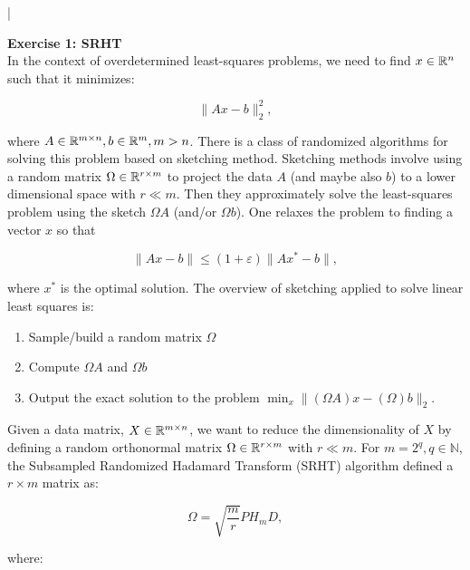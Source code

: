 \documentclass[11pt]{article}
\begin{document}
\lstset{frameround=fttt,language=Matlab}

\lstMakeShortInline[columns=fixed]|



{\bf{Exercise 1: SRHT}} \\

In the context of overdetermined least-squares problems, we need to find $x \in \mathbb{R}^n$ such that it minimizes:

\[ \|Ax - b\|_2^2, \]

where $A \in \mathbb{R}^{m \times n}, b \in \mathbb{R}^{m}, m > n$. There is a class of randomized algorithms for solving this problem based on sketching method. Sketching methods involve using a random matrix $\Omega \in \mathbb{R}^{r \times m}$ to project the data $A$ (and maybe also $b$) to a lower dimensional space with $r \ll m$. Then they approximately solve the least-squares problem using the sketch $\Omega A$ (and/or $\Omega b$).  One relaxes the problem to finding a vector $x$ so that 

\[ \|Ax - b\| \leq (1 + \varepsilon)\|Ax^* - b\|, \]

where $x^*$ is the optimal solution. The overview of sketching applied to solve linear least squares is:

\begin{enumerate}
    \item Sample/build a random matrix $\Omega$
    \item Compute $\Omega A$ and $\Omega b$
    \item Output the exact solution to the problem $\min_{x} \| (\Omega A)x - (\Omega) b\|_2$.
\end{enumerate}

Given a data matrix, $X \in \mathbb{R}^{m \times n}$, we want to reduce the dimensionality of $X$ by defining a random orthonormal matrix $\Omega \in \mathbb{R}^{r \times m}$ with $r \ll m$. For $m = 2^q, q \in \mathbb{N}$, the Subsampled Randomized Hadamard Transform (SRHT) algorithm defined a $r \times m$ matrix as:

\[ \Omega = \sqrt{\frac{m}{r}} PH_{m}D, \]

where:
\end{document}
